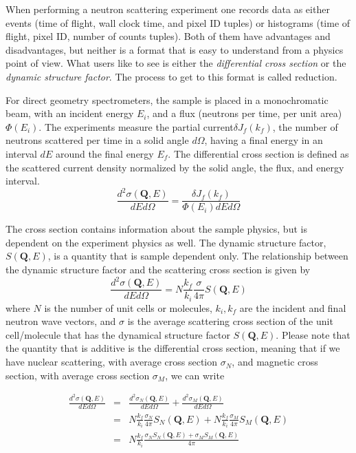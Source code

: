When performing a neutron scattering experiment one records data as either events (time of flight, wall clock time, and pixel ID tuples) or histograms (time of flight, pixel ID, number of counts tuples). Both of them have advantages and disadvantages, but neither is a format that is easy to understand from a physics point of view. What users like to see is either the {\it differential cross section} or the {\it dynamic structure factor}. The process to get to this format is called reduction. 

For direct geometry spectrometers, the sample is placed in a monochromatic beam, with an incident energy $E_i$, and a flux (neutrons per time, per unit area) $\Phi(E_i)$. 
The experiments measure the partial current$\delta J_f(k_f)$, the number of neutrons scattered per time in a solid angle $d\Omega$, having a final energy in an interval $dE$ around the final energy $E_f$. The differential cross section is defined as the scattered current density normalized by the solid angle, the flux, and energy interval.
\begin{equation}\label{crosssection}
\frac{d^2\sigma(\textbf{Q},E)}{dE d\Omega}=\frac{\delta J_f(k_f)}{\Phi(E_i) dE d\Omega}
\end{equation} 

The cross section contains information about the sample physics, but is dependent on the experiment physics as well. The dynamic structure factor, $S(\textbf{Q},E)$, is a quantity that is sample dependent only. The relationship between the dynamic structure factor and the scattering cross section is given by
\begin{equation}\label{structurefactor}
\frac{d^2\sigma(\textbf{Q},E)}{dE d\Omega}=N\frac{k_f}{k_i}\frac{\sigma}{4\pi} S(\textbf{Q},E)
\end{equation}
where $N$ is the number of unit cells or molecules, $k_i, k_f$ are the incident and final neutron wave vectors, and $\sigma$ is the average scattering cross section of the unit cell/molecule that has the dynamical structure factor $S(\textbf{Q},E)$. Please note that the quantity that is additive is the differential cross section, meaning that if we have nuclear scattering, with average cross section $\sigma_N$, and magnetic cross section, with average cross section $\sigma_M$, we can write 
  
\begin{eqnarray*}
\frac{d^2\sigma(\textbf{Q},E)}{dE d\Omega}&=&\frac{d^2\sigma _N(\textbf{Q},E)}{dE d\Omega}+\frac{d^2\sigma _M(\textbf{Q},E)}{dE d\Omega}\\
&=&N\frac{k_f}{k_i}\frac{\sigma _N}{4\pi} S_N(\textbf{Q},E)+N\frac{k_f}{k_i}\frac{\sigma _M}{4\pi} S_M(\textbf{Q},E)\\
&=&N\frac{k_f}{k_i}\frac{\sigma _N S_N(\textbf{Q},E)+\sigma _M S_M(\textbf{Q},E) } {4\pi}
\end{eqnarray*}


